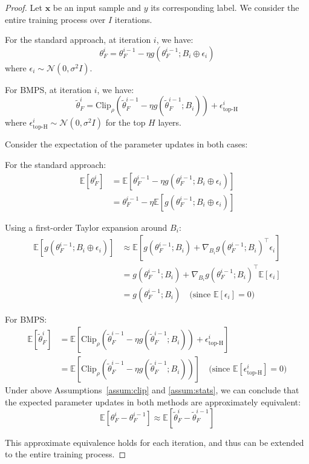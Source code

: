 \begin{proof}
Let $\mathbf{x}$ be an input sample and $y$ its corresponding label. We consider the entire training process over $I$ iterations.

For the standard approach, at iteration $i$, we have:
\begin{equation}
    \theta^i_F = \theta^{i-1}_F - \eta g(\theta^{i-1}_F; B_i \oplus \epsilon_i) %
\end{equation}
where $\epsilon_i \sim \mathcal{N}(0, \sigma^2I)$.

For BMPS, at iteration $i$, we have:
\begin{equation}
    \tilde{\theta}^i_F = \text{Clip}_\rho(\tilde{\theta}^{i-1}_F - \eta g(\tilde{\theta}^{i-1}_F; B_i)) + \epsilon^i_\text{top-H}
\end{equation}
where $\epsilon^i_\text{top-H} \sim \mathcal{N}(0, \sigma^2I)$ for the top $H$ layers.

Consider the expectation of the parameter updates in both cases:

For the standard approach:
\begin{align}
    \mathbb{E}[\theta^i_F] &= \mathbb{E}[\theta^{i-1}_F - \eta g(\theta^{i-1}_F; B_i \oplus \epsilon_i)] \\
    &= \theta^{i-1}_F - \eta \mathbb{E}[g(\theta^{i-1}_F; B_i \oplus \epsilon_i)]
\end{align}

Using a first-order Taylor expansion around $B_i$:
\begin{align}
    \mathbb{E}[g(\theta^{i-1}_F; B_i \oplus \epsilon_i)] &\approx \mathbb{E}[g(\theta^{i-1}_F; B_i) + \nabla_{B_i} g(\theta^{i-1}_F; B_i)^\top \epsilon_i] \\
    &= g(\theta^{i-1}_F; B_i) + \nabla_{B_i} g(\theta^{i-1}_F; B_i)^\top \mathbb{E}[\epsilon_i] \\
    &= g(\theta^{i-1}_F; B_i) \quad \text{(since } \mathbb{E}[\epsilon_i] = 0\text{)}
\end{align}

For BMPS:
\begin{align}
    \mathbb{E}[\tilde{\theta}^i_F] &= \mathbb{E}[\text{Clip}_\rho(\tilde{\theta}^{i-1}_F - \eta g(\tilde{\theta}^{i-1}_F; B_i)) + \epsilon^i_\text{top-H}] \\
    &= \mathbb{E}[\text{Clip}_\rho(\tilde{\theta}^{i-1}_F - \eta g(\tilde{\theta}^{i-1}_F; B_i))] \quad \text{(since } \mathbb{E}[\epsilon^i_\text{top-H}] = 0\text{)}
\end{align}
Under above Assumptions~\ref{assum:clip} and \ref{assum:stats}, we can conclude that the expected parameter updates in both methods are approximately equivalent:
\begin{equation}
    \mathbb{E}[\theta^i_F - \theta^{i-1}_F] \approx \mathbb{E}[\tilde{\theta}^i_F - \tilde{\theta}^{i-1}_F]
\end{equation}

This approximate equivalence holds for each iteration, and thus can be extended to the entire training process.
\end{proof}


